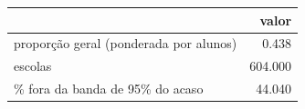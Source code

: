 \begin{tabular}{lr}
\toprule
 & valor \\
\midrule
proporção geral (ponderada por alunos) & 0.438 \\
escolas & 604.000 \\
\% fora da banda de 95\% do acaso & 44.040 \\
\bottomrule
\end{tabular}

